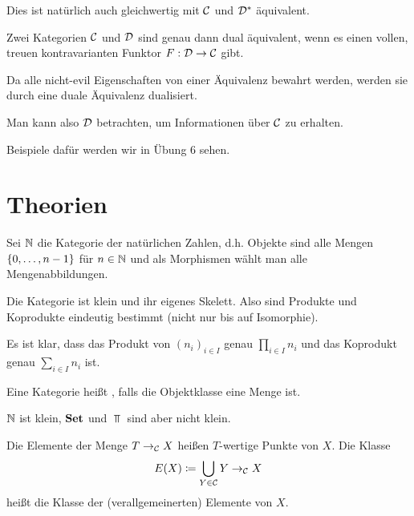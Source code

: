 \documentclass{book}
\begin{document}
\begin{remark}
    Dies ist natürlich auch gleichwertig mit $\mathcal{C}$ und $\mathcal{D}^{\ast}$ äquivalent.
\end{remark}

\begin{remark}
    Zwei Kategorien $\mathcal{C}$ und $\mathcal{D}$ sind genau dann dual äquivalent, wenn es einen vollen, treuen kontravarianten Funktor $F:\mathcal{D}\rightarrow\mathcal{C}$ gibt.
\end{remark}

Da alle nicht-evil Eigenschaften von einer Äquivalenz bewahrt werden, werden sie durch eine duale Äquivalenz dualisiert.

Man kann also $\mathcal{D}$ betrachten, um Informationen über $\mathcal{C}$ zu erhalten.

Beispiele dafür werden wir in Übung 6 sehen.

\section{ Theorien}

\begin{definition}
    Sei $\mathbb{N}$ die Kategorie der natürlichen Zahlen, d.h. Objekte sind alle Mengen
    $\left\{0,\ldots,n-1\right\}$
    für $n\in\mathbb{N}$ und als Morphismen wählt man alle Mengenabbildungen.
\end{definition}

\begin{remark}
    Die Kategorie ist klein und ihr eigenes Skelett. Also sind Produkte und Koprodukte eindeutig bestimmt (nicht nur bis auf Isomorphie).
\end{remark}

Es ist klar, dass das Produkt von ${(n_i)}_{i\in I}$ genau $\prod_{i\in I}{n_i}$ und das Koprodukt genau $\sum_{i\in I}{n_i}$ ist.

\begin{definition}
    Eine Kategorie heißt , falls die Objektklasse eine Menge ist.
\end{definition}

\begin{example}
    $\mathbb{N}$ ist klein, $\mathbf{Set}$ und $\Top$ sind aber nicht klein.
\end{example}

\begin{definition}[Elemente]
    Die Elemente der Menge $T\rightarrow_{\mathcal{C}} X$ heißen $T$-wertige Punkte von $X$. Die Klasse
    $$
    E(X)\mathrel{\mathrel{\mathop:}\mkern-1.2mu=}\bigcup_{Y\in \mathcal{C}}{Y\rightarrow_{\mathcal{C}} X} 
    $$
    heißt die Klasse der (verallgemeinerten) Elemente von $X$.
\end{definition}
\end{document}
